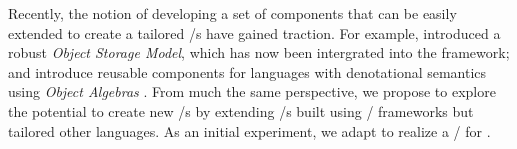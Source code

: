 Recently, the notion of developing a set of components that can be easily extended to create a tailored \VM/s have gained traction. For example,  introduced a robust \emph{Object Storage Model}, which has now been intergrated into the \Truffle framework; and  introduce reusable components for languages with denotational semantics using \emph{Object Algebras} . From much the same perspective, we propose to explore the potential to create new \VM/s by extending \VM/s built using \VM/ frameworks but tailored other languages. As an initial experiment, we adapt \SOMns to realize a \VM/ for \Grace.


%




%






% 
